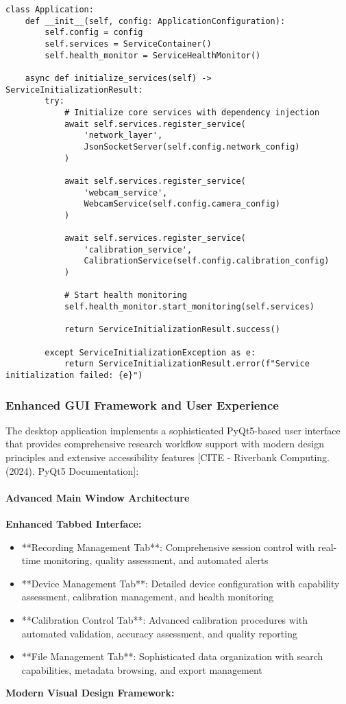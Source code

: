 \documentclass[12pt,a4paper]{report}
\begin{document}
\begin{verbatim}
class Application:
    def __init__(self, config: ApplicationConfiguration):
        self.config = config
        self.services = ServiceContainer()
        self.health_monitor = ServiceHealthMonitor()

    async def initialize_services(self) -> ServiceInitializationResult:
        try:
            # Initialize core services with dependency injection
            await self.services.register_service(
                'network_layer',
                JsonSocketServer(self.config.network_config)
            )

            await self.services.register_service(
                'webcam_service',
                WebcamService(self.config.camera_config)
            )

            await self.services.register_service(
                'calibration_service',
                CalibrationService(self.config.calibration_config)
            )

            # Start health monitoring
            self.health_monitor.start_monitoring(self.services)

            return ServiceInitializationResult.success()

        except ServiceInitializationException as e:
            return ServiceInitializationResult.error(f"Service initialization failed: {e}")
\end{verbatim}

\subsubsection{Enhanced GUI Framework and User Experience}

The desktop application implements a sophisticated PyQt5-based user interface that provides comprehensive research
workflow support with modern design principles and extensive accessibility
features [CITE - Riverbank Computing. (2024). PyQt5 Documentation]:

\paragraph{Advanced Main Window Architecture}

\textbf{Enhanced Tabbed Interface:}

\begin{itemize}
\item **Recording Management Tab**: Comprehensive session control with real-time monitoring, quality assessment, and
  automated alerts
\item **Device Management Tab**: Detailed device configuration with capability assessment, calibration management, and
  health monitoring
\item **Calibration Control Tab**: Advanced calibration procedures with automated validation, accuracy assessment, and
  quality reporting
\item **File Management Tab**: Sophisticated data organization with search capabilities, metadata browsing, and export
  management

\end{itemize}
\textbf{Modern Visual Design Framework:}
\end{document}
